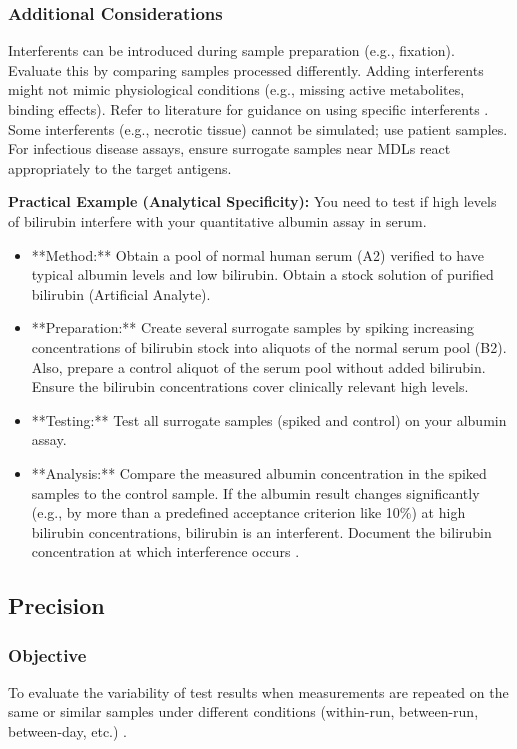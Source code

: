 \documentclass{article}
\begin{document}
\subsubsection{Additional Considerations}
Interferents can be introduced during sample preparation (e.g., fixation). Evaluate this by comparing samples processed differently. Adding interferents might not mimic physiological conditions (e.g., missing active metabolites, binding effects). Refer to literature for guidance on using specific interferents \cite{CLSIEP37}. Some interferents (e.g., necrotic tissue) cannot be simulated; use patient samples. For infectious disease assays, ensure surrogate samples near MDLs react appropriately to the target antigens.

\textbf{Practical Example (Analytical Specificity):}
You need to test if high levels of bilirubin interfere with your quantitative albumin assay in serum.
\begin{itemize}
    \item **Method:** Obtain a pool of normal human serum (A2) verified to have typical albumin levels and low bilirubin. Obtain a stock solution of purified bilirubin (Artificial Analyte).
    \item **Preparation:** Create several surrogate samples by spiking increasing concentrations of bilirubin stock into aliquots of the normal serum pool (B2). Also, prepare a control aliquot of the serum pool without added bilirubin. Ensure the bilirubin concentrations cover clinically relevant high levels.
    \item **Testing:** Test all surrogate samples (spiked and control) on your albumin assay.
    \item **Analysis:** Compare the measured albumin concentration in the spiked samples to the control sample. If the albumin result changes significantly (e.g., by more than a predefined acceptance criterion like 10\%) at high bilirubin concentrations, bilirubin is an interferent. Document the bilirubin concentration at which interference occurs \cite{CLSIEP07}.
\end{itemize}

\subsection{Precision}

\subsubsection{Objective}
To evaluate the variability of test results when measurements are repeated on the same or similar samples under different conditions (within-run, between-run, between-day, etc.) \cite{CLSIEP05}.
\end{document}
